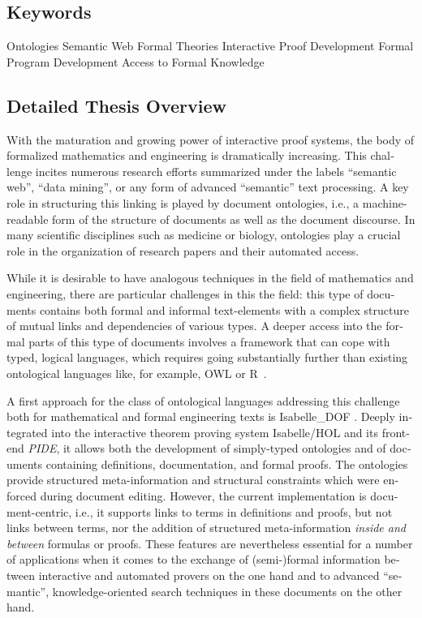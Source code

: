 \documentclass[a4paper,10pt]{article}
\begin{document}
\begin{english}

\subsection*{Keywords}

Ontologies \textemdash{}
Semantic Web \textemdash{}
Formal Theories \textemdash{}
Interactive Proof Development \textemdash{}
Formal Program Development \textemdash{}
Access to Formal Knowledge

\subsection*{Detailed Thesis Overview}

With the maturation and growing power of interactive proof systems,
the body of formalized mathematics and engineering is dramatically increasing.
This challenge incites numerous research efforts
summarized under the labels \enquote{semantic web}, \enquote{data mining},
or any form of advanced \enquote{semantic} text processing.
A key role in structuring this linking is played by document ontologies,
i.e., a machine-readable form of the structure of documents
as well as the document discourse.
In many scientific disciplines such as medicine or biology,
ontologies play a crucial role in the organization of research papers
and their automated access.

While it is desirable to have analogous techniques
in the field of mathematics and engineering,
there are particular challenges in this the field:
this type of documents contains both formal and informal text-elements
with a complex structure of mutual links and dependencies of various types.
A deeper access into the formal parts of this type of documents involves
a framework that can cope with typed, logical languages,
which requires going substantially further
than existing ontological languages
like, for example, OWL or R~\cite{owl2012,protege,owlgred,rontorium}.

A first approach for the class of ontological languages
addressing this challenge
both for mathematical and formal engineering texts is
Isabelle\_DOF
\cite{
  Brucker-ea.Using-CICM18,
  BruckerWolff.Design-SEFM19,
  BruckerWolff.Certif-IFM19%
}.
Deeply integrated into the interactive theorem proving system Isabelle/HOL
and its front-end \emph{PIDE},
it allows both the development of simply-typed ontologies
and of documents containing definitions, documentation,
and formal proofs.
The ontologies provide structured meta-information and structural constraints
which were enforced during document editing.
However, the current implementation is document-centric,
i.e., it supports links to terms in definitions and proofs,
but not links between terms, nor the addition of structured meta-information
\emph{inside and between} formulas or proofs.
These features are nevertheless essential for a number of applications
when it comes to the exchange of (semi-)formal information
between interactive and automated provers on the one hand
and to advanced \enquote{semantic}, knowledge-oriented search techniques
in these documents on the other hand.


\end{english}
\end{document}
